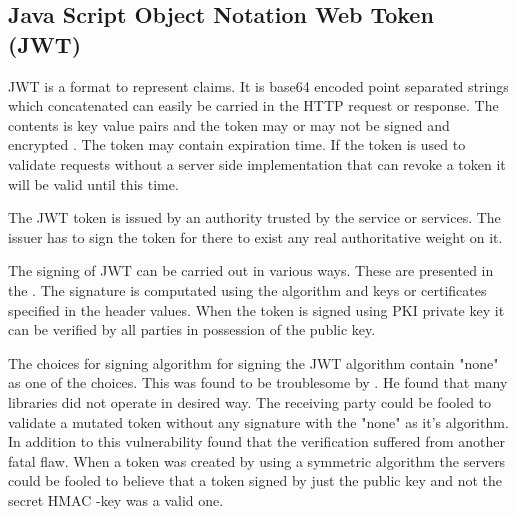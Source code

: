 
\subsection{Java Script Object Notation Web Token (JWT)}
\begin{sloppypar}
    JWT is a format to represent claims. It is base64 encoded point separated 
    strings which concatenated can easily be carried in the HTTP request or 
    response. The contents is key value pairs and the token may or may not be 
    signed and encrypted \citep{RFC7519}. The token may contain expiration time. 
    If the token is used to validate requests without a server side implementation 
    that can revoke a token it will be valid until this time.
\end{sloppypar}
\begin{sloppypar}
    The JWT token is issued by an authority trusted by the service or services. 
    The issuer has to sign the token for there to exist any real authoritative 
    weight on it.
\end{sloppypar}
\begin{sloppypar}
    The signing of JWT can be carried out in various ways. These are presented 
    in the \citet{RFC7515}. The signature is computated using the algorithm and 
    keys or certificates specified in the header values. When the token is 
    signed using PKI private key it can be verified by all parties in 
    possession of the public key. 
\end{sloppypar}
\begin{sloppypar}
    The choices for signing algorithm for signing the JWT algorithm contain 
    "none" as one of the choices. This was found to be troublesome by 
    \citet{nonejwt}. He found that many libraries did not operate in desired 
    way. The receiving party could be fooled to validate a mutated token without
    any signature with the "none" as it's algorithm. In addition to this 
    vulnerability \citet{nonejwt} found that the verification suffered from 
    another fatal flaw. When a token was created by using a symmetric algorithm 
    the servers could be fooled to believe that a token signed by just the 
    public key and not the secret HMAC -key was a valid one.
\end{sloppypar}


